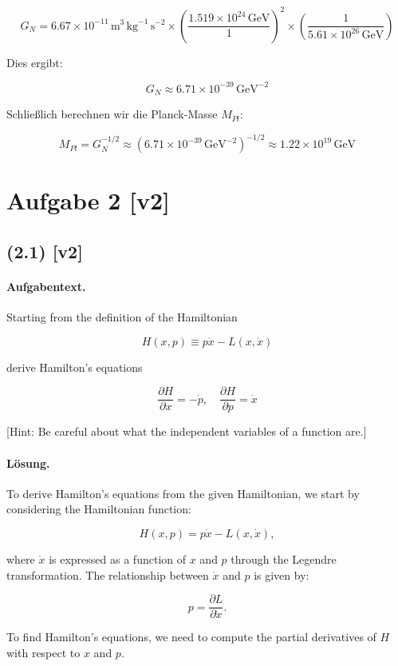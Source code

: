 \documentclass[11pt,a4paper]{article}
\begin{document}
\[
G_N = 6.67 \times 10^{-11} \, \mathrm{m}^3 \, \mathrm{kg}^{-1} \, \mathrm{s}^{-2} \times \left( \frac{1.519 \times 10^{24} \, \text{GeV}}{1} \right)^2 \times \left( \frac{1}{5.61 \times 10^{26} \, \text{GeV}} \right)
\]

Dies ergibt:

\[
G_N \approx 6.71 \times 10^{-39} \, \text{GeV}^{-2}
\]

Schließlich berechnen wir die Planck-Masse $M_{Pl}$:

\[
M_{Pl} = G_N^{-1/2} \approx (6.71 \times 10^{-39} \, \text{GeV}^{-2})^{-1/2} \approx 1.22 \times 10^{19} \, \text{GeV}
\]

\section*{Aufgabe 2 [v2]}
\subsection*{(2.1) [v2]}
\paragraph{Aufgabentext.}
Starting from the definition of the Hamiltonian

$$
H(x, p) \equiv p \dot{x}-L(x, \dot{x})
$$

derive Hamilton's equations

$$
\frac{\partial H}{\partial x}=-\dot{p}, \quad \frac{\partial H}{\partial p}=\dot{x}
$$

[Hint: Be careful about what the independent variables of a function are.]

\paragraph{Lösung.}
To derive Hamilton's equations from the given Hamiltonian, we start by considering the Hamiltonian function:

$$
H(x, p) = p \dot{x} - L(x, \dot{x}),
$$

where \( \dot{x} \) is expressed as a function of \( x \) and \( p \) through the Legendre transformation. The relationship between \( \dot{x} \) and \( p \) is given by:

$$
p = \frac{\partial L}{\partial \dot{x}}.
$$

To find Hamilton's equations, we need to compute the partial derivatives of \( H \) with respect to \( x \) and \( p \).
\end{document}
